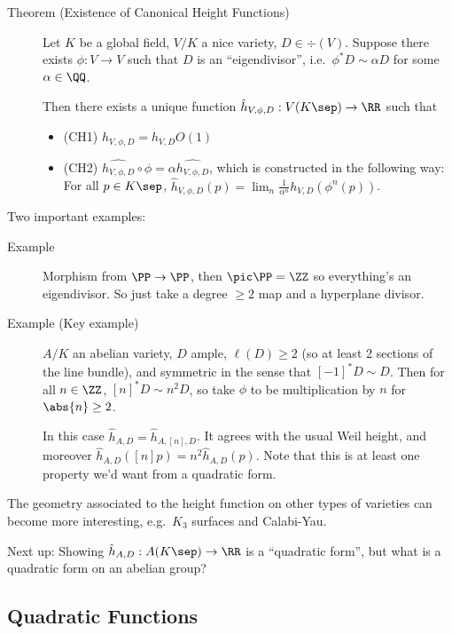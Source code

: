 \begin{description}
\item[Theorem (Existence of Canonical Height Functions)]
Let \(K\) be a global field, \(V/K\) a nice variety, \(D\in \div(V)\).
Suppose there exists \(\phi:V \to V\) such that \(D\) is an
``eigendivisor'', i.e.~\(\phi^* D \sim \alpha D\) for some
\(\alpha \in \QQ\).

Then there exists a unique function
\(\hat h_{V, \phi, D}: V(K\sep) \to \RR\) such that

\begin{itemize}
\tightlist
\item
  (CH1) \(\hat h_{V, \phi, D} = h_{V, D} O(1)\)
\item
  (CH2)
  \(\hat{h_{V, \phi, D}} \circ \phi = \alpha \hat{h_{V, \phi, D}}\),
  which is constructed in the following way: For all \(p\in K\sep\),
  \(\hat h_{V, \phi, D}(p) = \lim_n \frac{1}{\alpha^n} h_{V, D}(\phi^n(p))\).
\end{itemize}
\end{description}

Two important examples:

\begin{description}
\item[Example]
Morphism from \(\PP \to \PP\), then \(\pic \PP = \ZZ\) so everything's
an eigendivisor. So just take a degree \(\geq 2\) map and a hyperplane
divisor.
\item[Example (Key example)]
\(A/K\) an abelian variety, \(D\) ample, \(\ell(D) \geq 2\) (so at least
2 sections of the line bundle), and symmetric in the sense that
\([-1]^* D \sim D\). Then for all \(n\in \ZZ\), \([n]^* D \sim n^2 D\),
so take \(\phi\) to be multiplication by \(n\) for \(\abs{n} \geq 2\).

In this case \(\hat h_{A, D} = \hat h_{A, [n], D}\). It agrees with the
usual Weil height, and moreover
\(\hat h_{A, D}([n]p) = n^2 \hat h_{A, D}(p)\). Note that this is at
least one property we'd want from a quadratic form.
\end{description}

The geometry associated to the height function on other types of
varieties can become more interesting, e.g.~\(K_3\) surfaces and
Calabi-Yau.

Next up: Showing \(\hat h_{A, D}: A(K\sep) \to \RR\) is a ``quadratic
form'', but what is a quadratic form on an abelian group?

\hypertarget{quadratic-functions}{%
\subsection{Quadratic Functions}\label{quadratic-functions}}

